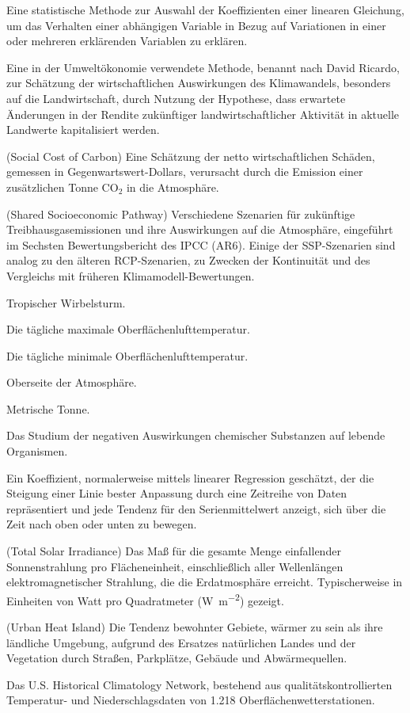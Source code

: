 \documentclass[12pt,paper=a4,DIV=12,parskip=never,chapterprefix=false,headings=standardclasses]{scrreprt}
\begin{document}
\begin{glossar}
\item[REGRESSION] Eine statistische Methode zur Auswahl der Koeffizienten einer linearen Gleichung, um das Verhalten einer abhängigen Variable in Bezug auf Variationen in einer oder mehreren erklärenden Variablen zu erklären.
\item[RICARDIANISCHE ANALYSE] Eine in der Umweltökonomie verwendete Methode, benannt nach David Ricardo, zur Schätzung der wirtschaftlichen Auswirkungen des Klimawandels, besonders auf die Landwirtschaft, durch Nutzung der Hypothese, dass erwartete Änderungen in der Rendite zukünftiger landwirtschaftlicher Aktivität in aktuelle Landwerte kapitalisiert werden.
\item[SCC] (Social Cost of Carbon) Eine Schätzung der netto wirtschaftlichen Schäden, gemessen in Gegenwartswert-Dollars, verursacht durch die Emission einer zusätzlichen Tonne CO$_2$ in die Atmosphäre.
\item[SSP-SZENARIEN] (Shared Socioeconomic Pathway) Verschiedene Szenarien für zukünftige Treibhausgasemissionen und ihre Auswirkungen auf die Atmosphäre, eingeführt im Sechsten Bewertungsbericht des IPCC (AR6). Einige der SSP-Szenarien sind analog zu den älteren RCP-Szenarien, zu Zwecken der Kontinuität und des Vergleichs mit früheren Klimamodell-Bewertungen.
\item[TC] Tropischer Wirbelsturm.
\item[TMAX] Die tägliche maximale Oberflächenlufttemperatur.
\item[TMIN] Die tägliche minimale Oberflächenlufttemperatur.
\item[TOA] Oberseite der Atmosphäre.
\item[TONNE] Metrische Tonne.
\item[TOXIKOLOGIE] Das Studium der negativen Auswirkungen chemischer Substanzen auf lebende Organismen.
\item[TREND] Ein Koeffizient, normalerweise mittels linearer Regression geschätzt, der die Steigung einer Linie bester Anpassung durch eine Zeitreihe von Daten repräsentiert und jede Tendenz für den Serienmittelwert anzeigt, sich über die Zeit nach oben oder unten zu bewegen.
\item[TSI] (Total Solar Irradiance) Das Maß für die gesamte Menge einfallender Sonnenstrahlung pro Flächeneinheit, einschließlich aller Wellenlängen elektromagnetischer Strahlung, die die Erdatmosphäre erreicht. Typischerweise in Einheiten von Watt pro Quadratmeter (\si{\watt\per\square\meter}) gezeigt.
\item[UHI] (Urban Heat Island) Die Tendenz bewohnter Gebiete, wärmer zu sein als ihre ländliche Umgebung, aufgrund des Ersatzes natürlichen Landes und der Vegetation durch Straßen, Parkplätze, Gebäude und Abwärmequellen.
\item[USHCN] Das U.S. Historical Climatology Network, bestehend aus qualitätskontrollierten Temperatur- und Niederschlagsdaten von 1.218 Oberflächenwetterstationen.
\end{glossar}
\end{document}
